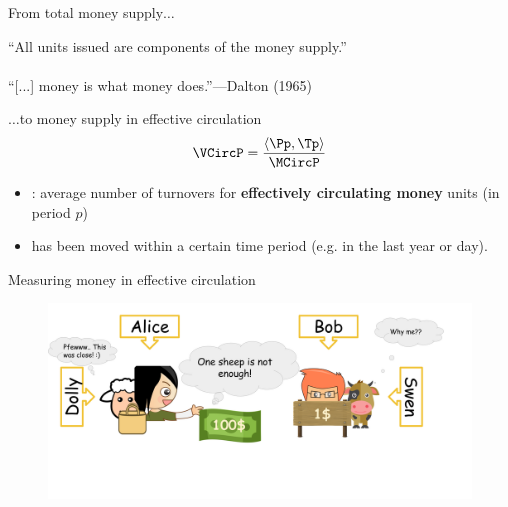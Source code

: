 \begin{frame}[t]{From total money supply$\dots$}
	\vspace{1em}
	\begin{center}
		``All units issued are components of the money supply.''\\
		\\
		``[...] money is what money does.''---Dalton (1965)
	\end{center}
	\vspace{1em} 
\end{frame}

\begin{frame}[t]{$\dots$to money supply in effective circulation}	
	\begin{align*}
		\VCircP = \frac{\langle\Pp,\Tp\rangle}{\MCircP}
	\end{align*}        
    \begin{itemize}\setlength{\itemsep}{1em}
       	\item {} : average number of turnovers for \textbf{effectively circulating money} units (in period \(p\))
       	\item {} has been moved within a certain time period (e.g. in the last year or day).  
	\end{itemize}
\end{frame}

%		

\begin{frame}{Measuring money in effective circulation}%
\vspace{0.5ex}
	\begin{figure}
		\centering
		\includegraphics[width=\linewidth]{./pics/used/sheep_example_wba_mca.png}
	\end{figure}
\end{frame}

